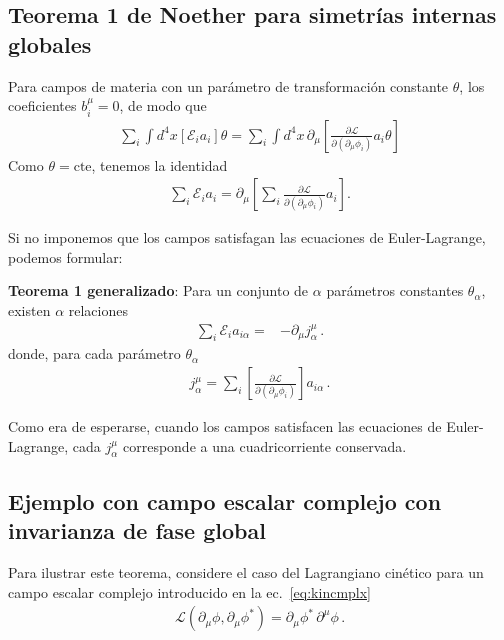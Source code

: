 \subsection{Teorema 1 de Noether para simetrías internas globales}
\begin{frame}
Para campos de materia con un parámetro de transformación constante $\theta$, los coeficientes $b_i^{\mu}=0$, de modo que
\begin{align}
 \sum_i\int {d^4}x \left[ \mathcal{E}_ia_i  \right]  \theta   =  \sum_i \int {d^4}x\, \partial_{\mu} \left[ \frac{\partial\mathcal{L}}{\partial(\partial_{\mu}\phi_i)} a_i \theta  \right]
\end{align}
Como $\theta=\text{cte}$, tenemos la identidad
\begin{align}
  \sum_i\mathcal{E}_ia_i    =  \partial_{\mu} \left[  \sum_i\frac{\partial\mathcal{L}}{\partial(\partial_{\mu}\phi_i)}a_i\right].
\end{align}


Si no imponemos que los campos satisfagan las ecuaciones de Euler-Lagrange, podemos formular:

\textbf{Teorema 1 generalizado}: Para un conjunto de $\alpha$ parámetros constantes $\theta_{\alpha}$, existen $\alpha$ relaciones
\begin{align}
     \sum_i \mathcal{E}_ia_{i\alpha}     
 =&-  \partial_{\mu} j^{\mu}_{\alpha}\,.
\end{align}
donde, para cada parámetro $\theta_{\alpha}$
\begin{align}
  \label{eq:t1gen}
  j^\mu_{\alpha}=\sum_i\left[ \frac{\partial\mathcal{L}}{\partial(\partial_{\mu}\phi_i)}\right] a_{i\alpha}\,.
\end{align}
\end{frame}

Como era de esperarse, cuando los campos satisfacen las ecuaciones de Euler-Lagrange, cada  $j^{\mu}_{\alpha}$ corresponde a una cuadricorriente conservada.

\subsection{Ejemplo con campo escalar complejo con invarianza de fase global}
Para ilustrar este teorema, considere el caso del Lagrangiano cinético para un campo escalar complejo introducido en la ec.~\eqref{eq:kincmplx}
\begin{align}
  \mathcal{L}(\partial_{\mu} \phi,\partial_{\mu} \phi^{*})=  {\partial_\mu\phi^{*}}\,{\partial^\mu\phi}\,.
\end{align}

